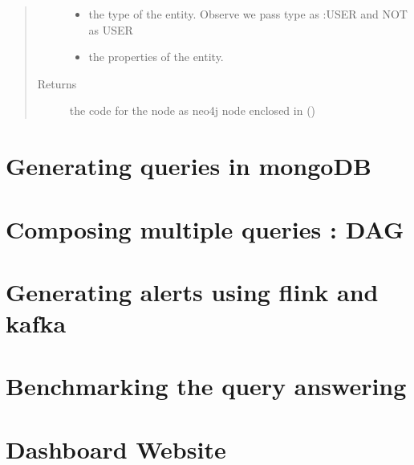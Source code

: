 \documentclass[letterpaper,10pt,english]{sphinxmanual}
\begin{document}
\begin{fulllineitems}
\begin{fulllineitems}
\begin{quote}
\begin{description}
\begin{itemize}
\item {} 
 \textendash{} the type of the entity. Observe we pass type as :USER and NOT as USER

\item {} 
 \textendash{} the properties of the entity.

\end{itemize}

\item[{Returns}] \leavevmode
the code for the node as neo4j node enclosed in ()

\end{description}\end{quote}

\end{fulllineitems}


\end{fulllineitems}



\chapter{Generating queries in mongoDB}
\label{\detokenize{mongoDB_query_generation::doc}}\label{\detokenize{mongoDB_query_generation:generating-queries-in-mongodb}}

\chapter{Composing multiple queries : DAG}
\label{\detokenize{dag::doc}}\label{\detokenize{dag:composing-multiple-queries-dag}}

\chapter{Generating alerts using flink and kafka}
\label{\detokenize{flink::doc}}\label{\detokenize{flink:generating-alerts-using-flink-and-kafka}}

\chapter{Benchmarking the query answering}
\label{\detokenize{benchmarking::doc}}\label{\detokenize{benchmarking:benchmarking-the-query-answering}}

\chapter{Dashboard Website}
\label{\detokenize{dashboard_website::doc}}\label{\detokenize{dashboard_website:dashboard-website}}
\end{document}
